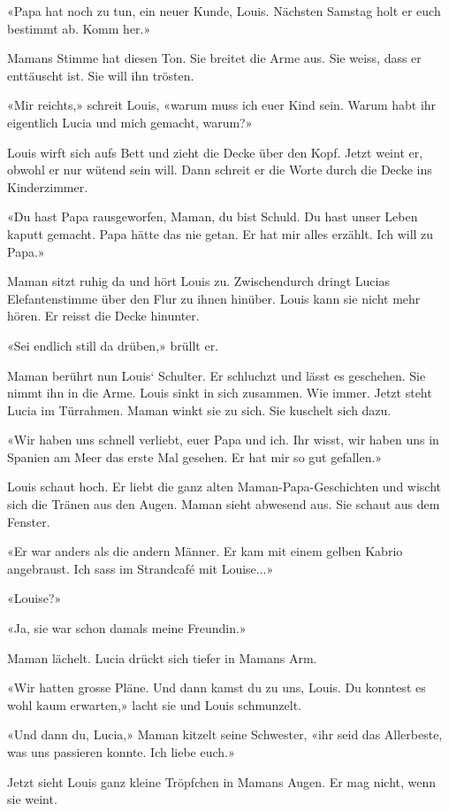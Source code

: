 «Papa hat noch zu tun, ein neuer Kunde, Louis. Nächsten Samstag holt er
euch bestimmt ab. Komm her.»

Mamans Stimme hat diesen Ton. Sie breitet die Arme aus. Sie weiss, dass
er enttäuscht ist. Sie will ihn trösten.

«Mir reichts,» schreit Louis, «warum muss ich euer Kind sein. Warum habt
ihr eigentlich Lucia und mich gemacht, warum?»

Louis wirft sich aufs Bett und zieht die Decke über den Kopf. Jetzt
weint er, obwohl er nur wütend sein will. Dann schreit er die Worte
durch die Decke ins Kinderzimmer.

«Du hast Papa rausgeworfen, Maman, du bist Schuld. Du hast unser Leben
kaputt gemacht. Papa hätte das nie getan. Er hat mir alles erzählt. Ich
will zu Papa.»

Maman sitzt ruhig da und hört Louis zu. Zwischendurch dringt Lucias
Elefantenstimme über den Flur zu ihnen hinüber. Louis kann sie nicht
mehr hören. Er reisst die Decke hinunter.

«Sei endlich still da drüben,» brüllt er.

Maman berührt nun Louis` Schulter. Er schluchzt und lässt es geschehen.
Sie nimmt ihn in die Arme. Louis sinkt in sich zusammen. Wie immer.
Jetzt steht Lucia im Türrahmen. Maman winkt sie zu sich. Sie kuschelt
sich dazu.

«Wir haben uns schnell verliebt, euer Papa und ich. Ihr wisst, wir haben
uns in Spanien am Meer das erste Mal gesehen. Er hat mir so gut
gefallen.»

Louis schaut hoch. Er liebt die ganz alten Maman-Papa-Geschichten und
wischt sich die Tränen aus den Augen. Maman sieht abwesend aus. Sie
schaut aus dem Fenster.

«Er war anders als die andern Männer. Er kam mit einem gelben Kabrio
angebraust. Ich sass im Strandcafé mit Louise...»

«Louise?»

«Ja, sie war schon damals meine Freundin.»

Maman lächelt. Lucia drückt sich tiefer in Mamans Arm.

«Wir hatten grosse Pläne. Und dann kamst du zu uns, Louis. Du konntest
es wohl kaum erwarten,» lacht sie und Louis schmunzelt.

«Und dann du, Lucia,» Maman kitzelt seine Schwester, «ihr seid das
Allerbeste, was uns passieren konnte. Ich liebe euch.»

Jetzt sieht Louis ganz kleine Tröpfchen in Mamans Augen. Er mag nicht,
wenn sie weint.

